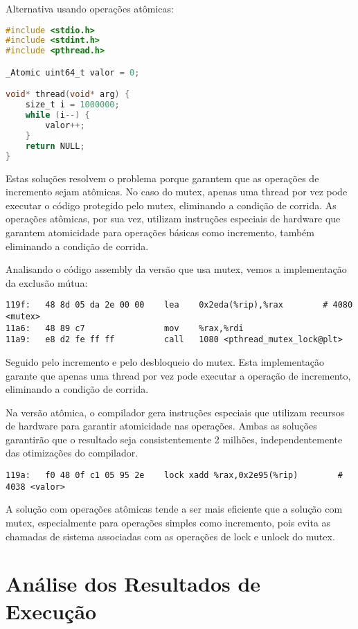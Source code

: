 \documentclass[12pt]{article}
\begin{document}
Alternativa usando operações atômicas:

\begin{lstlisting}[language=C]
#include <stdio.h>
#include <stdint.h>
#include <pthread.h>

_Atomic uint64_t valor = 0;

void* thread(void* arg) {
    size_t i = 1000000;
    while (i--) {
        valor++;
    }
    return NULL;
}
\end{lstlisting}

Estas soluções resolvem o problema porque garantem que as operações de incremento sejam atômicas. No caso do mutex, apenas uma thread por vez pode executar o código protegido pelo mutex, eliminando a condição de corrida. As operações atômicas, por sua vez, utilizam instruções especiais de hardware que garantem atomicidade para operações básicas como incremento, também eliminando a condição de corrida.

Analisando o código assembly da versão que usa mutex, vemos a implementação da exclusão mútua:

\begin{lstlisting}[language={[x86masm]Assembler}]
119f:	48 8d 05 da 2e 00 00 	lea    0x2eda(%rip),%rax        # 4080 <mutex>
11a6:	48 89 c7             	mov    %rax,%rdi
11a9:	e8 d2 fe ff ff       	call   1080 <pthread_mutex_lock@plt>
\end{lstlisting}

Seguido pelo incremento e pelo desbloqueio do mutex. Esta implementação garante que apenas uma thread por vez pode executar a operação de incremento, eliminando a condição de corrida.

Na versão atômica, o compilador gera instruções especiais que utilizam recursos de hardware para garantir atomicidade nas operações. Ambas as soluções garantirão que o resultado seja consistentemente 2 milhões, independentemente das otimizações do compilador.

\begin{lstlisting}[language={[x86masm]Assembler}]
119a:	f0 48 0f c1 05 95 2e 	lock xadd %rax,0x2e95(%rip)        # 4038 <valor>
\end{lstlisting}

A solução com operações atômicas tende a ser mais eficiente que a solução com mutex, especialmente para operações simples como incremento, pois evita as chamadas de sistema associadas com as operações de lock e unlock do mutex.

\section{Análise dos Resultados de Execução}
\end{document}
